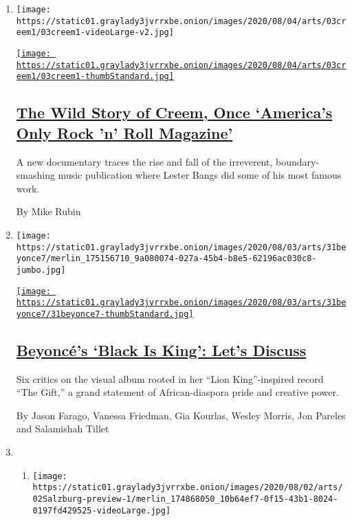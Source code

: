 \begin{enumerate}
\def\labelenumi{\arabic{enumi}.}
\item
  \texttt{[image: https://static01.graylady3jvrrxbe.onion/images/2020/08/04/arts/03creem1/03creem1-videoLarge-v2.jpg]}

  \href{/2020/08/03/arts/music/creem-magazine-documentary.html}{\texttt{[image: https://static01.graylady3jvrrxbe.onion/images/2020/08/04/arts/03creem1/03creem1-thumbStandard.jpg]}}

  \hypertarget{the-wild-story-of-creem-once-americas-only-rock-n-roll-magazine}{%
  \subsection{\texorpdfstring{\href{/2020/08/03/arts/music/creem-magazine-documentary.html}{The
  Wild Story of Creem, Once `America's Only Rock 'n' Roll
  Magazine'}}{The Wild Story of Creem, Once `America's Only Rock 'n' Roll Magazine'}}\label{the-wild-story-of-creem-once-americas-only-rock-n-roll-magazine}}

  A new documentary traces the rise and fall of the irreverent,
  boundary-smashing music publication where Lester Bangs did some of his
  most famous work.

  By Mike Rubin
\item
  \texttt{[image: https://static01.graylady3jvrrxbe.onion/images/2020/08/03/arts/31beyonce7/merlin\_175156710\_9a080074-027a-45b4-b8e5-62196ac030c8-jumbo.jpg]}

  \href{/2020/07/31/arts/music/beyonce-black-is-king.html}{\texttt{[image: https://static01.graylady3jvrrxbe.onion/images/2020/08/03/arts/31beyonce7/31beyonce7-thumbStandard.jpg]}}

  \hypertarget{beyoncuxe9s-black-is-king-lets-discuss}{%
  \subsection{\texorpdfstring{\href{/2020/07/31/arts/music/beyonce-black-is-king.html}{Beyoncé's
  `Black Is King': Let's
  Discuss}}{Beyoncé's `Black Is King': Let's Discuss}}\label{beyoncuxe9s-black-is-king-lets-discuss}}

  Six critics on the visual album rooted in her ``Lion King''-inspired
  record ``The Gift,'' a grand statement of African-diaspora pride and
  creative power.

  By Jason Farago, Vanessa Friedman, Gia Kourlas, Wesley Morris, Jon
  Pareles and Salamishah Tillet
\item
  \begin{enumerate}
  \def\labelenumii{\arabic{enumii}.}
  \item
    \texttt{[image: https://static01.graylady3jvrrxbe.onion/images/2020/08/02/arts/02Salzburg-preview-1/merlin\_174868050\_10b64ef7-0f15-43b1-8024-0197fd429525-videoLarge.jpg]}


\end{enumerate}
\end{enumerate}
